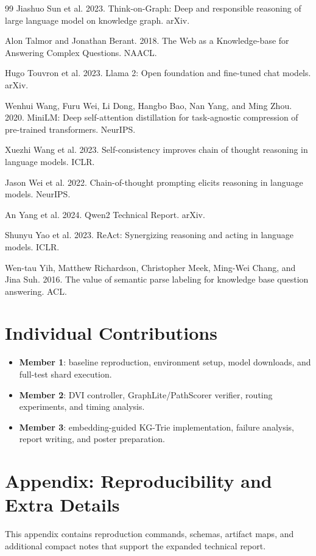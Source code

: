 \documentclass[10pt,twocolumn]{article}
\begin{document}
\begin{thebibliography}{99}
Jiashuo Sun et al. 2023.
Think-on-Graph: Deep and responsible reasoning of large language model on knowledge graph. arXiv.

Alon Talmor and Jonathan Berant. 2018.
The Web as a Knowledge-base for Answering Complex Questions. NAACL.

Hugo Touvron et al. 2023.
Llama 2: Open foundation and fine-tuned chat models. arXiv.

Wenhui Wang, Furu Wei, Li Dong, Hangbo Bao, Nan Yang, and Ming Zhou. 2020.
MiniLM: Deep self-attention distillation for task-agnostic compression of pre-trained transformers. NeurIPS.

Xuezhi Wang et al. 2023.
Self-consistency improves chain of thought reasoning in language models. ICLR.

Jason Wei et al. 2022.
Chain-of-thought prompting elicits reasoning in language models. NeurIPS.

An Yang et al. 2024.
Qwen2 Technical Report. arXiv.

Shunyu Yao et al. 2023.
ReAct: Synergizing reasoning and acting in language models. ICLR.

Wen-tau Yih, Matthew Richardson, Christopher Meek, Ming-Wei Chang, and Jina Suh. 2016.
The value of semantic parse labeling for knowledge base question answering. ACL.
\end{thebibliography}

\section*{Individual Contributions}
\begin{itemize}
  \item \textbf{Member 1}: baseline reproduction, environment setup, model downloads, and full-test shard execution.
  \item \textbf{Member 2}: DVI controller, GraphLite/PathScorer verifier, routing experiments, and timing analysis.
  \item \textbf{Member 3}: embedding-guided KG-Trie implementation, failure analysis, report writing, and poster preparation.
\end{itemize}

\clearpage
\appendix

\section{Appendix: Reproducibility and Extra Details}
\small
This appendix contains reproduction commands, schemas, artifact maps, and additional compact notes that support the expanded technical report.
\end{document}
